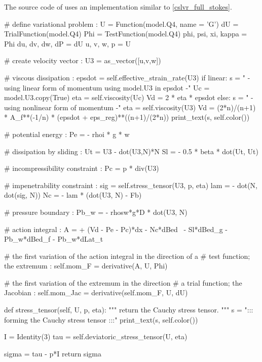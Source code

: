 The source code of \CSLVR uses an implementation similar to \cref{cslvr_full_stokes}.

\begin{python}[label=cslvr_full_stokes, caption={\CSLVR source code contained in the \texttt{MomentumDukowiczStokes} class.}]
# define variational problem :
U                    = Function(model.Q4, name = 'G')
dU                   = TrialFunction(model.Q4)
Phi                  = TestFunction(model.Q4)
phi, psi, xi,  kappa = Phi
du,  dv,  dw,  dP    = dU
u,   v,   w,   p     = U

# create velocity vector :
U3      = as_vector([u,v,w])

# viscous dissipation :
epsdot  = self.effective_strain_rate(U3)
if linear:
  s   = "    - using linear form of momentum using model.U3 in epsdot -"
  Uc  = model.U3.copy(True)
  eta = self.viscosity(Uc)
  Vd  = 2 * eta * epsdot
else:
  s   = "    - using nonlinear form of momentum -"
  eta = self.viscosity(U3)
  Vd  = (2*n)/(n+1) * A_f**(-1/n) * (epsdot + eps_reg)**((n+1)/(2*n))
print_text(s, self.color())

# potential energy :
Pe     = - rhoi * g * w

# dissipation by sliding :
Ut     = U3 - dot(U3,N)*N
Sl     = - 0.5 * beta * dot(Ut, Ut)

# incompressibility constraint :
Pc     = p * div(U3)

# impenetrability constraint :
sig    = self.stress_tensor(U3, p, eta)
lam    = - dot(N, dot(sig, N))
Nc     = - lam * (dot(U3, N) - Fb)

# pressure boundary :
Pb_w   = - rhosw*g*D * dot(U3, N)

# action integral :
A      = + (Vd - Pe - Pc)*dx - Nc*dBed \
         - Sl*dBed_g - Pb_w*dBed_f - Pb_w*dLat_t

# the first variation of the action integral in the direction of a 
# test function; the extremum :
self.mom_F = derivative(A, U, Phi)

# the first variation of the extremum in the direction 
# a trial function; the Jacobian :
self.mom_Jac = derivative(self.mom_F, U, dU)

def stress_tensor(self, U, p, eta):
  """
  return the Cauchy stress tensor.
  """
  s   = "::: forming the Cauchy stress tensor :::"
  print_text(s, self.color())

  I     = Identity(3)
  tau   = self.deviatoric_stress_tensor(U, eta)

  sigma = tau - p*I
  return sigma


\end{python}
